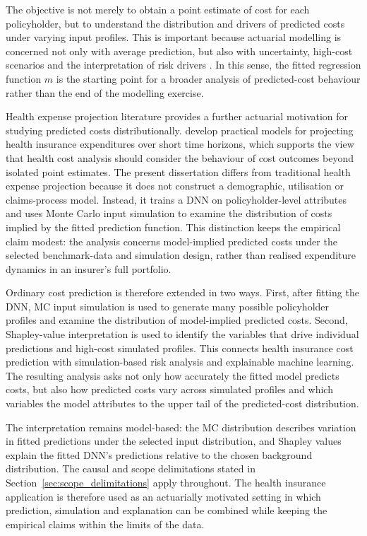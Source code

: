 \noindent
The objective is not merely to obtain a point estimate of cost for each
policyholder, but to understand the distribution and drivers of predicted costs
under varying input profiles. This is important because actuarial modelling is
concerned not only with average prediction, but also with uncertainty,
high-cost scenarios and the interpretation of risk drivers
\citep{denuit2007actuarial}. In this sense, the fitted regression function
\(\widehat{m}\) is the starting point for a broader analysis of predicted-cost
behaviour rather than the end of the modelling exercise.

\noindent
Health expense projection literature provides a further actuarial motivation for studying predicted costs distributionally. \citet{christiansen2018projection}
develop practical models for projecting health insurance expenditures over
short time horizons, which supports the view that health cost analysis should
consider the behaviour of cost outcomes beyond isolated point estimates. The
present dissertation differs from traditional health expense projection because
it does not construct a demographic, utilisation or claims-process model.
Instead, it trains a DNN on policyholder-level attributes and uses Monte
Carlo input simulation to examine the distribution of costs implied by the
fitted prediction function. This distinction keeps the empirical claim modest:
the analysis concerns model-implied predicted costs under the selected
benchmark-data and simulation design, rather than realised expenditure
dynamics in an insurer's full portfolio.

\noindent
Ordinary cost prediction is therefore extended in two ways. First, after fitting
the DNN, MC input simulation is used to generate many
possible policyholder profiles and examine the distribution of model-implied
predicted costs. Second, Shapley-value interpretation is used to identify the
variables that drive individual predictions and high-cost simulated profiles.
This connects health insurance cost prediction with simulation-based risk
analysis and explainable machine learning. The resulting analysis asks not only
how accurately the fitted model predicts costs, but also how predicted costs
vary across simulated profiles and which variables the model attributes to the
upper tail of the predicted-cost distribution.

\noindent
The interpretation remains model-based: the MC distribution describes
variation in fitted predictions under the selected input distribution, and
Shapley values explain the fitted DNN's predictions relative to the
chosen background distribution.  The causal and scope delimitations stated in
Section~\ref{sec:scope_delimitations} apply throughout.  The health insurance
application is therefore used as an actuarially motivated setting in which
prediction, simulation and explanation can be combined while keeping the
empirical claims within the limits of the data.


